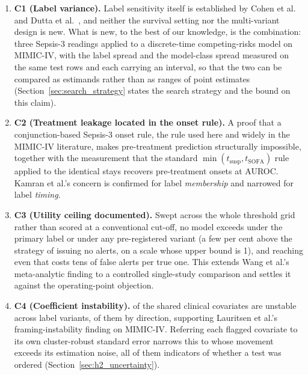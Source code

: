 \begin{enumerate}
    \item \textbf{C1 (Label variance).} Label sensitivity itself is established
    by Cohen et al.\ \cite{cohen2024subtle} and Dutta et al.\
    \cite{dutta2026performance}, and neither the survival setting nor the
    multi-variant design is new. What is new, to the best of our knowledge, is
    the combination: three Sepsis-3 readings applied to a discrete-time
    competing-risks model on MIMIC-IV, with the label spread and the
    model-class spread measured on the same test rows and each carrying an
    interval, so that the two can be compared as estimands rather than as
    ranges of point estimates (Section~\ref{sec:search_strategy} states the
    search strategy and the bound on this claim).

    \item \textbf{C2 (Treatment leakage located in the onset rule).} A proof that
    a conjunction-based Sepsis-3 onset rule, the rule used here and widely in
    the MIMIC-IV literature, makes pre-treatment prediction structurally
    impossible, together with the measurement that the standard
    $\min(t_{\text{susp}}, t_{\text{SOFA}})$ rule applied to the identical stays
    recovers \pcPreTreatOnsetsVarF{} pre-treatment onsets at
    \pcPreTreatAurocPrimaryF{} AUROC. Kamran et al.'s
    \cite{kamran2024evaluation} concern is confirmed for label \emph{membership}
    and narrowed for label \emph{timing}.

    \item \textbf{C3 (Utility ceiling documented).} Swept across the whole
    threshold grid rather than scored at a conventional cut-off, no model
    exceeds \pcUtilityMaxGbtB{} under the primary label or
    \pcUtilityMaxGbtC{} under any pre-registered variant (a few per cent
    above the strategy of issuing no alerts, on a scale whose upper bound is 1), and reaching even that costs tens of false alerts per true one. This
    extends Wang et al.'s \cite{wang2025srpm} meta-analytic finding to a
    controlled single-study comparison and settles it against the
    operating-point objection.

    \item \textbf{C4 (Coefficient instability).} \pcHTwoEst{} of the
    \pcHTwoNTerms{} shared clinical covariates are unstable across label
    variants, \pcHTwoNSign{} of them by direction, supporting Lauritsen et
    al.'s \cite{lauritsen2021framing} framing-instability finding on MIMIC-IV.
    Referring each flagged covariate to its own cluster-robust standard error
    narrows this to \pcHTwoNRobust{} whose movement exceeds its estimation
    noise, all of them indicators of whether a test was ordered
    (Section~\ref{sec:h2_uncertainty}).


\end{enumerate}
